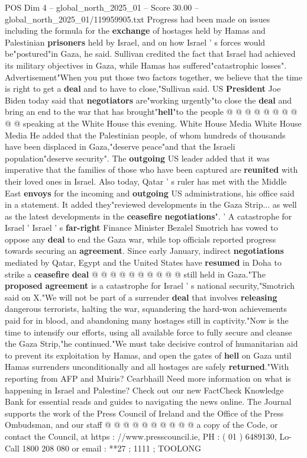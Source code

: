 \begin{textsample}{POS Dim 4 – global\_north\_2025\_01 – Score 30.00 – global\_north\_2025\_01/119959905.txt}
Progress had been made on issues including the formula for the \textbf{exchange} of hostages held by Hamas and Palestinian \textbf{prisoners} held by Israel, and on how Israel ' s forces would be"postured"in Gaza, he said.
Sullivan credited the fact that Israel had achieved its military objectives in Gaza, while Hamas has suffered"catastrophic losses".
Advertisement"When you put those two factors together, we believe that the time is right to get a \textbf{deal} and to have to close,"Sullivan said.
US \textbf{President} Joe Biden today said that \textbf{negotiators} are"working urgently"to close the \textbf{deal} and bring an end to the war that has brought"\textbf{hell}"to the people @ @ @ @ @ @ @ @ @ @ speaking at the White House this evening.
White House Media White House Media He added that the Palestinian people, of whom hundreds of thousands have been displaced in Gaza,"deserve peace"and that the Israeli population"deserve security".
The \textbf{outgoing} US leader added that it was imperative that the families of those who have been captured are \textbf{reunited} with their loved ones in Israel.
Also today, Qatar ' s ruler has met with the Middle East \textbf{envoys} for the incoming and \textbf{outgoing} US administrations, his office said in a statement.
It added they"reviewed developments in the Gaza Strip... as well as the latest developments in the \textbf{ceasefire} \textbf{negotiations}". ' A catastrophe for Israel ' Israel ' s \textbf{far-right} Finance Minister Bezalel Smotrich has vowed to oppose any \textbf{deal} to end the Gaza war, while top officials reported progress towards securing an \textbf{agreement}.
Since early January, indirect \textbf{negotiations} mediated by Qatar, Egypt and the United States have \textbf{resumed} in Doha to strike a \textbf{ceasefire} \textbf{deal} @ @ @ @ @ @ @ @ @ @ still held in Gaza."The \textbf{proposed} \textbf{agreement} is a catastrophe for Israel ' s national security,"Smotrich said on X."We will not be part of a surrender \textbf{deal} that involves \textbf{releasing} dangerous terrorists, halting the war, squandering the hard-won achievements paid for in blood, and abandoning many hostages still in captivity."Now is the time to intensify our efforts, using all available force to fully secure and cleanse the Gaza Strip,"he continued."We must take decisive control of humanitarian aid to prevent its exploitation by Hamas, and open the gates of \textbf{hell} on Gaza until Hamas surrenders unconditionally and all hostages are safely \textbf{returned}."With reporting from AFP and Muiris?
Cearbhaill Need more information on what is happening in Israel and Palestine?
Check out our new FactCheck Knowledge Bank for essential reads and guides to navigating the news online.
The Journal supports the work of the Press Council of Ireland and the Office of the Press Ombudsman, and our staff @ @ @ @ @ @ @ @ @ @ a copy of the Code, or contact the Council, at https : //www.presscouncil.ie, PH : ( 01 ) 6489130, Lo-Call 1800 208 080 or email : **27 ; 1111 ; TOOLONG


\end{textsample}
